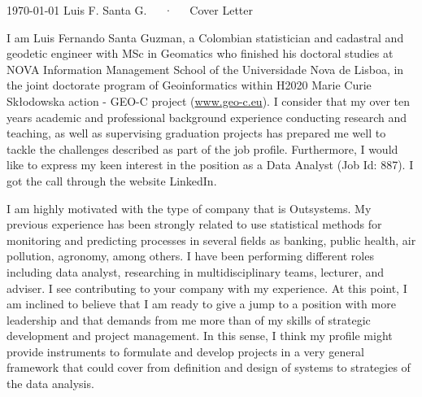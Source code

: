 \documentclass[11pt, a4paper]{awesome-cv}
\begin{document}
\makecvheader[R]

\makecvfooter
  {\today}
    {Luis F. Santa G.~~~·~~~Cover Letter}
  {}

\makelettertitle

\begin{cvletter}


I am Luis Fernando Santa Guzman, a Colombian statistician and cadastral and geodetic engineer with MSc in Geomatics who finished his doctoral studies at NOVA Information Management School of the Universidade Nova de Lisboa, in the joint doctorate program of Geoinformatics within H2020 Marie Curie Skłodowska action - GEO-C project (\url{www.geo-c.eu}). I consider that my over ten years academic and professional background experience conducting research and teaching, as well as supervising graduation projects has prepared me well to tackle the challenges described as part of the job profile. Furthermore, I would like to express my keen interest in the position as a Data Analyst (Job Id:  887). I got the call through the website LinkedIn.\par 
I am highly motivated with the type of company that is Outsystems. My previous experience has been strongly related to use statistical methods for monitoring and predicting processes in several fields as banking, public health, air pollution, agronomy, among others. I have been performing different roles including data analyst, researching in multidisciplinary teams, lecturer, and adviser. I see contributing to your company with my experience. At this point, I am inclined to believe that I am ready to give a jump to a position with more leadership and that demands from me more than of my skills of strategic development and project management. In this sense, I think my profile might provide instruments to formulate and develop projects in a very general framework that could cover from definition and design of systems to strategies of the data analysis.\par

\end{cvletter}
\end{document}
